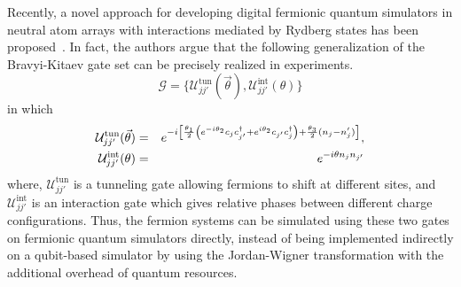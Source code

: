\documentclass[aps, prx, reprint, superscriptaddress]{revtex4-2}
\begin{document}
Recently, a novel approach for developing digital fermionic quantum simulators in neutral atom arrays with interactions mediated by Rydberg states has been proposed~\cite{gonzalez2023fermionic}. In fact, the authors argue that the following generalization of the Bravyi-Kitaev gate set can be precisely realized in experiments. 
\begin{equation}
\mathcal{G} = \lbrace \mathcal{U}_{jj'}^{\text{tun}} (\vec{\theta}), \mathcal{U}_{jj'}^{\text{int}} (\theta) \rbrace
\end{equation}
in which
\begin{eqnarray}
    \mathcal{U}_{jj'}^{\text{tun}} (\vec{\theta}) &=& e^{-i \left[ \frac{\theta_1}{2}\left( e^{-i\theta_2} c_{j} c_{j'}^{\dagger}+ e^{i\theta_2} c_{j'} c_{j}^{\dagger} \right) + \frac{\theta_3}{2} (n_j - n_j') \right]}, \cr
    \mathcal{U}_{jj'}^{\text{int}} (\theta) &=& e^{-i\theta n_{j} n_{j'}}
    \label{eq:gen_bk}
\end{eqnarray}
where, $\mathcal{U}_{jj'}^{\text{tun}}$ is a tunneling gate allowing fermions to shift at different sites, and $\mathcal{U}_{jj'}^{\text{int}}$ is an interaction gate which
gives relative phases between different charge configurations.  
Thus, the fermion systems can be simulated using these two gates on fermionic quantum simulators directly, instead of being implemented indirectly on a qubit-based simulator by using the Jordan-Wigner transformation with the additional overhead of quantum resources. 
\end{document}
